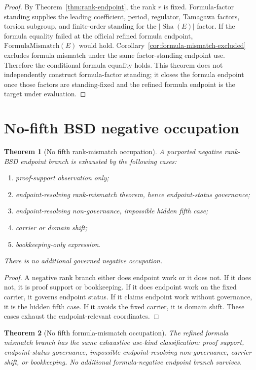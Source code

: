 \documentclass[11pt]{article}
\newtheorem{theorem}{Theorem}[section]
\newcommand{\Sha}{\operatorname{Sha}}
\newcommand{\FormulaMismatch}{\mathrm{FormulaMismatch}}
\begin{document}
\begin{proof}
By Theorem~\ref{thm:rank-endpoint}, the rank $r$ is fixed. Formula-factor standing supplies the leading coefficient, period, regulator, Tamagawa factors, torsion subgroup, and finite-order standing for the $|\Sha(E)|$ factor. If the formula equality failed at the official refined formula endpoint, $\FormulaMismatch(E)$ would hold. Corollary~\ref{cor:formula-mismatch-excluded} excludes formula mismatch under the same factor-standing endpoint use. Therefore the conditional formula equality holds. This theorem does not independently construct formula-factor standing; it closes the formula endpoint once those factors are standing-fixed and the refined formula endpoint is the target under evaluation.
\end{proof}

\section{No-fifth BSD negative occupation}

\begin{theorem}[No fifth rank-mismatch occupation]
A purported negative rank-BSD endpoint branch is exhausted by the following cases:
\begin{enumerate}[label=(\roman*)]
\item proof-support observation only;
\item endpoint-resolving rank-mismatch theorem, hence endpoint-status governance;
\item endpoint-resolving non-governance, impossible hidden fifth case;
\item carrier or domain shift;
\item bookkeeping-only expression.
\end{enumerate}
There is no additional governed negative occupation.
\end{theorem}

\begin{proof}
A negative rank branch either does endpoint work or it does not. If it does not, it is proof support or bookkeeping. If it does endpoint work on the fixed carrier, it governs endpoint status. If it claims endpoint work without governance, it is the hidden fifth case. If it avoids the fixed carrier, it is domain shift. These cases exhaust the endpoint-relevant coordinates.
\end{proof}

\begin{theorem}[No fifth formula-mismatch occupation]
The refined formula mismatch branch has the same exhaustive use-kind classification: proof support, endpoint-status governance, impossible endpoint-resolving non-governance, carrier shift, or bookkeeping. No additional formula-negative endpoint branch survives.
\end{theorem}
\end{document}

